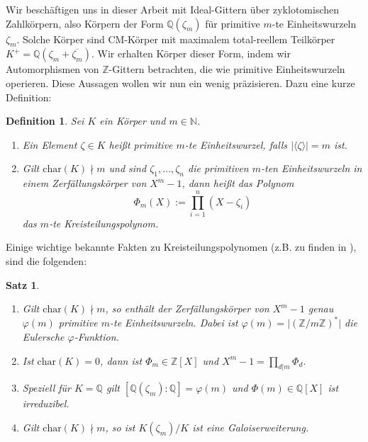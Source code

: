 \documentclass[12pt,a4paper,halfparskip,headsepline,bibtotocnumbered]{scrreprt}
\theoremstyle{nummermitklammern}
\newtheorem{definition}[defsatzusw]{Definition}
\newtheorem{satz}[defsatzusw]{Satz}
\theoremstyle{nonumberbreak}
\newcommand{\N}{\mathbb{N}}
\newcommand{\Z}{\mathbb{Z}}
\newcommand{\Q}{\mathbb{Q}}
\begin{document}
Wir beschäftigen uns in dieser Arbeit mit Ideal-Gittern über zyklotomischen Zahlkörpern, also Körpern der Form $\Q(\zeta_m)$ für primitive $m$-te Einheitswurzeln $\zeta_m$. Solche Körper sind CM-Körper mit maximalem total-reellem Teilkörper $K^+ = \Q(\zeta_m + \overline{\zeta_m})$. Wir erhalten Körper dieser Form, indem wir Automorphismen von $\Z$-Gittern betrachten, die wie primitive Einheitswurzeln operieren. Diese Aussagen wollen wir nun ein wenig präzisieren. Dazu eine kurze Definition:

\begin{framed}
	\begin{definition}
		Sei $K$ ein Körper und $m \in \N$. 
		\begin{enumerate}
			\item Ein Element $\zeta \in K$ heißt primitive $m$-te Einheitswurzel, falls $\vert \langle \zeta \rangle \vert = m$ ist.
			\item Gilt $\text{char}(K) \nmid m$ und sind $\zeta_1, \dots, \zeta_n$ die primitiven $m$-ten Einheitswurzeln in einem Zerfällungskörper von $X^m - 1$, dann heißt das Polynom
				\begin{equation*}
					\Phi_m(X) := \prod_{i=1}^n (X - \zeta_i)
				\end{equation*}
				das \textit{$m$-te Kreisteilungspolynom}.
		\end{enumerate}
	\end{definition}
\end{framed}

Einige wichtige bekannte Fakten zu Kreisteilungspolynomen (z.B. zu finden in \cite[Kap. 1]{Mollin}), sind die folgenden:

\begin{framed}
	\begin{satz}\label{th:cycpol}
		\begin{enumerate}[label=(\roman*)]
			\item Gilt $\text{char}(K) \nmid m$, so enthält der Zerfällungskörper von $X^m-1$ genau $\varphi(m)$ primitive $m$-te Einheitswurzeln. Dabei ist $\varphi(m) = \vert \left( \Z / m \Z \right)^\ast \vert$ die \textit{Eulersche $\varphi$-Funktion}.
			\item Ist $\text{char}(K) = 0$, dann ist $\Phi_m \in \Z \left[ X \right]$ und $X^m-1 = \prod_{d \vert m} \Phi_d$.
			\item Speziell für $K = \Q$ gilt $\left[ \Q \left( \zeta_m \right) : \Q \right] = \varphi (m)$ und $\Phi (m) \in \Q \left[ X \right]$ ist irreduzibel.
			\item Gilt $\text{char}(K) \nmid m$, so ist $K(\zeta_m) / K$ ist eine Galoiserweiterung.
		\end{enumerate}
	\end{satz}
\end{framed}
\end{document}
